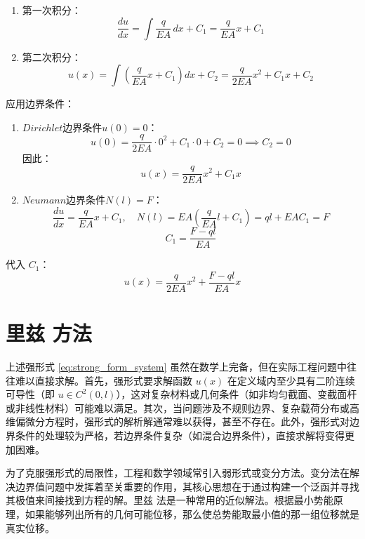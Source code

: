 \documentclass[engineeringmaster]{hquThesis}
\begin{document}
\begin{enumerate}
    \item 第一次积分：
    \begin{equation}
    \frac{du}{dx} = \int \frac{q}{EA} \, dx + C_1 = \frac{q}{EA} x + C_1
    \label{eq:integral1}
    \end{equation}
    \item 第二次积分：
    \begin{equation}
    u(x) = \int \left( \frac{q}{EA} x + C_1 \right) dx + C_2 = \frac{q}{2EA} x^2 + C_1 x + C_2
    \label{eq:integral2}
    \end{equation}
\end{enumerate}
应用边界条件：
\begin{enumerate}
    \item \(Dirichlet\)边界条件\( u(0) = 0 \)：
    \[
    u(0) = \frac{q}{2EA} \cdot 0^2 + C_1 \cdot 0 + C_2 = 0 \implies C_2 = 0
    \]
    因此：
    \begin{equation}
    u(x) = \frac{q}{2EA} x^2 + C_1 x
    \label{eq:u_temp}
    \end{equation}
    \item \(Neumann\)边界条件\( N(l) = F \)：
    \[
    \frac{du}{dx} = \frac{q}{EA} x + C_1, \quad N(l) = EA \left( \frac{q}{EA} l + C_1 \right) = q l + EA C_1 = F
    \]
    \[
    C_1 = \frac{F - q l}{EA}
    \]
\end{enumerate}
代入 \( C_1 \)：
\begin{equation}
    u(x) = \frac{q}{2EA} x^2 + \frac{F - q l}{EA} x
    \label{eq:analytical_solution}
\end{equation}

\section{里兹 方法}
上述强形式 \eqref{eq:strong_form_system} 虽然在数学上完备，但在实际工程问题中往往难以直接求解。首先，强形式要求解函数 \( u(x) \) 在定义域内至少具有二阶连续可导性（即 \( u \in C^2(0, l) \)），这对复杂材料或几何条件（如非均匀截面、变截面杆或非线性材料）可能难以满足。其次，当问题涉及不规则边界、复杂载荷分布或高维偏微分方程时，强形式的解析解通常难以获得，甚至不存在。此外，强形式对边界条件的处理较为严格，若边界条件复杂（如混合边界条件），直接求解将变得更加困难。

为了克服强形式的局限性，工程和数学领域常引入弱形式或变分方法。变分法在解决边界值问题中发挥着至关重要的作用，其核心思想在于通过构建一个泛函并寻找其极值来间接找到方程的解。里兹 法是一种常用的近似解法。根据最小势能原理，如果能够列出所有的几何可能位移，那么使总势能取最小值的那一组位移就是真实位移。
\end{document}
